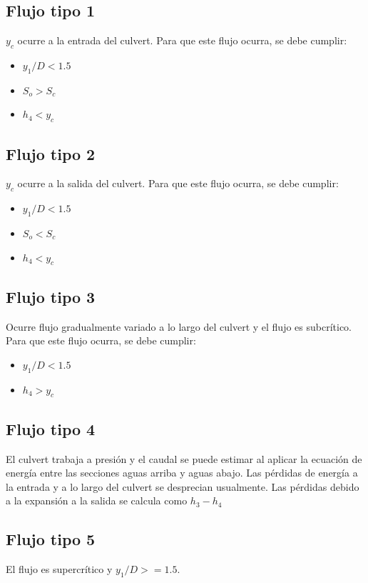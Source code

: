 \documentclass[11pt, oneside]{article}
\begin{document}
\subsection*{Flujo tipo 1}
$y_c$ ocurre a la entrada del culvert. Para que este flujo ocurra, se debe cumplir:
\begin{itemize}
    \item $y_1/D < 1.5$ 
    \item $S_o > S_c$
    \item $h_4 < y_c$
\end{itemize}

\subsection*{Flujo tipo 2}
$y_c$ ocurre a la salida del culvert. Para que este flujo ocurra, se debe cumplir:
\begin{itemize}
    \item $y_1/D < 1.5$ 
    \item $S_o < S_c$
    \item $h_4 < y_c$
\end{itemize}

\subsection*{Flujo tipo 3}
Ocurre flujo gradualmente variado a lo largo del culvert y el flujo es subcr\'itico. Para que este flujo ocurra, se debe cumplir:
\begin{itemize}
    \item $y_1/D < 1.5$ 
    \item $h_4 > y_c$ 
\end{itemize}

\subsection*{Flujo tipo 4}
El culvert trabaja a presi\'on y el caudal se puede estimar al aplicar la ecuaci\'on de energ\'ia entre las secciones aguas arriba y aguas abajo. Las p\'erdidas de energ\'ia a la entrada y a lo largo del culvert se desprecian usualmente. Las p\'erdidas debido a la expansi\'on a la salida se calcula como $h_3 - h_4$ 

\subsection*{Flujo tipo 5}
El flujo es supercr\'itico y $y_1/D >= 1.5$. 
\end{document}
